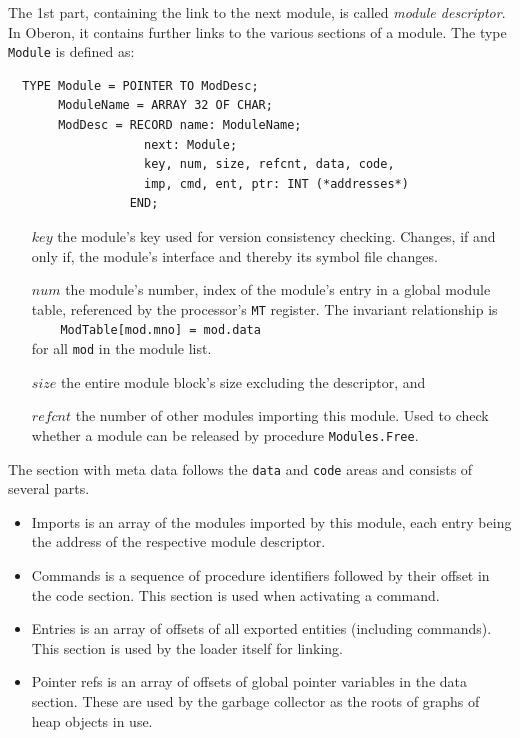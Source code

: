 The 1st part, containing the link to the next module, is called \emph{module descriptor}.
In Oberon, it contains further links to the various sections of a module.
The type \verb|Module| is defined as:
\begin{verbatim}
  TYPE Module = POINTER TO ModDesc;
       ModuleName = ARRAY 32 OF CHAR;
       ModDesc = RECORD name: ModuleName;
                   next: Module;
                   key, num, size, refcnt, data, code,
                   imp, cmd, ent, ptr: INT (*addresses*)
                 END;
\end{verbatim}
\begin{itemize}
  \item[$key$] the module's key used for version consistency checking.
    Changes, if and only if, the module's interface and thereby its symbol file changes.
  \item[$num$] the module's number, index of the module's entry in a global module table,
    referenced by the processor's \verb|MT| register. The invariant relationship is \\
    \verb|    ModTable[mod.mno] = mod.data| \\ for all \verb|mod| in the module list.
  \item[$size$] the entire module block's size excluding the descriptor, and
  \item[$re\!f\!cnt$] the number of other modules importing this module.
    Used to check whether a module can be released by procedure \verb|Modules.Free|.
\end{itemize}
The section with meta data follows the \verb|data| and \verb|code| areas
and consists of several parts.
\begin{itemize}
  \item Imports is an array of the modules imported by this module,
    each entry being the address of the respective module descriptor.
  \item Commands is a sequence of procedure identifiers followed by their offset in the code section.
    This section is used when activating a command.
  \item Entries is an array of offsets of all exported entities (including commands).
    This section is used by the loader itself for linking.
  \item Pointer refs is an array of offsets of global pointer variables in the data section.
    These are used by the garbage collector as the roots of graphs of heap objects in use.
\end{itemize}
